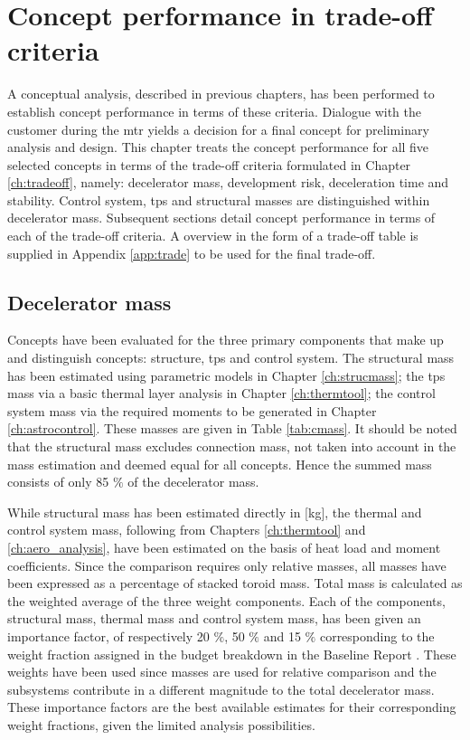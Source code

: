 \section{Concept performance in trade-off criteria}\label{ch:tfsum}

 A conceptual analysis, described in previous chapters, has been performed to establish concept performance in terms of these criteria. Dialogue with the customer during the \acrfull{mtr} yields a decision for a final concept for preliminary analysis and design. This chapter treats the concept performance for all five selected concepts in terms of the trade-off criteria formulated in Chapter \ref{ch:tradeoff}, namely: decelerator mass, development risk, deceleration time and stability. Control system, \acrfull{tps} and structural masses are distinguished within decelerator mass. Subsequent sections detail concept performance in terms of each of the trade-off criteria. A overview in the form of a trade-off table is supplied in Appendix \ref{app:trade} to be used for the final trade-off.

\subsection{Decelerator mass}
Concepts have been evaluated for the three primary components that make up and distinguish concepts: structure, \acrfull{tps} and control system. The structural mass has been estimated using parametric models in Chapter \ref{ch:strucmass}; the \gls{tps} mass via a basic thermal layer analysis in Chapter \ref{ch:thermtool}; the control system mass via the required moments to be generated in Chapter \ref{ch:astrocontrol}.  These masses are given in Table \ref{tab:cmass}. It should be noted that the structural mass excludes connection mass, not taken into account in the mass estimation and deemed equal for all concepts. Hence the summed mass consists of only 85 $\%$ of the decelerator mass. 

While structural mass has been estimated directly in [kg], the thermal and control system mass, following from Chapters  \ref{ch:thermtool} and \ref{ch:aero_analysis}, have been estimated on the basis of heat load and moment coefficients. Since the comparison requires only relative masses, all  masses have been expressed as a percentage of stacked toroid mass. Total mass is calculated as the weighted average of the three weight components. Each of the components, structural mass, thermal mass and control system mass, has been given an importance factor, of respectively 20 $\%$,  50 $\%$ and  15 $\%$ corresponding to the weight fraction assigned in the budget breakdown in the Baseline Report \cite[p.28]{Balasooriyan2015a}. These weights have been used since masses are used for relative comparison and the subsystems contribute in a different magnitude to the total decelerator mass. These importance factors are the best available estimates for their corresponding weight fractions, given the limited analysis possibilities.

